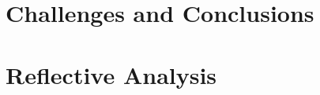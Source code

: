 \documentclass[harvard]{lincolncsuthesis}
\begin{document}
\chapter{Challenges and Conclusions}


\chapter{Reflective Analysis}






\printReferences
%
\end{document}
